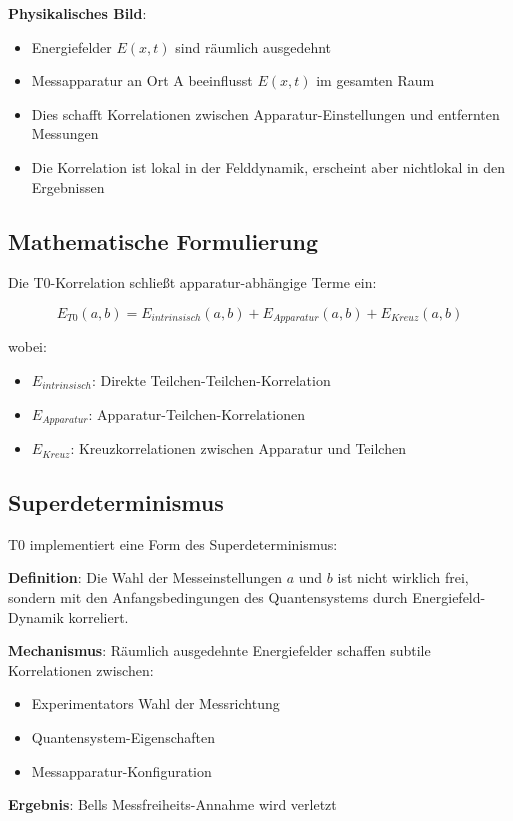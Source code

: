 \documentclass[12pt,a4paper]{article}
\newcommand{\Efield}{E}
\begin{document}
	\textbf{Physikalisches Bild}:
	\begin{itemize}
		\item Energiefelder $\Efield(x,t)$ sind räumlich ausgedehnt
		\item Messapparatur an Ort A beeinflusst $\Efield(x,t)$ im gesamten Raum
		\item Dies schafft Korrelationen zwischen Apparatur-Einstellungen und entfernten Messungen
		\item Die Korrelation ist lokal in der Felddynamik, erscheint aber nichtlokal in den Ergebnissen
	\end{itemize}
	
	\subsection{Mathematische Formulierung}
	
	Die T0-Korrelation schließt apparatur-abhängige Terme ein:
	
	\begin{equation}
		E_{T0}(a,b) = E_{intrinsisch}(a,b) + E_{Apparatur}(a,b) + E_{Kreuz}(a,b)
	\end{equation}
	
	wobei:
	\begin{itemize}
		\item $E_{intrinsisch}$: Direkte Teilchen-Teilchen-Korrelation
		\item $E_{Apparatur}$: Apparatur-Teilchen-Korrelationen
		\item $E_{Kreuz}$: Kreuzkorrelationen zwischen Apparatur und Teilchen
	\end{itemize}
	
	\subsection{Superdeterminismus}
	
	T0 implementiert eine Form des Superdeterminismus:
	
	\begin{tcolorbox}[colback=blue!5!white,colframe=blue!75!black,title=T0-Superdeterminismus]
		\textbf{Definition}: Die Wahl der Messeinstellungen $a$ und $b$ ist nicht wirklich frei, sondern mit den Anfangsbedingungen des Quantensystems durch Energiefeld-Dynamik korreliert.
		
		\textbf{Mechanismus}: Räumlich ausgedehnte Energiefelder schaffen subtile Korrelationen zwischen:
		\begin{itemize}
			\item Experimentators Wahl der Messrichtung
			\item Quantensystem-Eigenschaften
			\item Messapparatur-Konfiguration
		\end{itemize}
		
		\textbf{Ergebnis}: Bells Messfreiheits-Annahme wird verletzt
	\end{tcolorbox}
	
\end{document}
